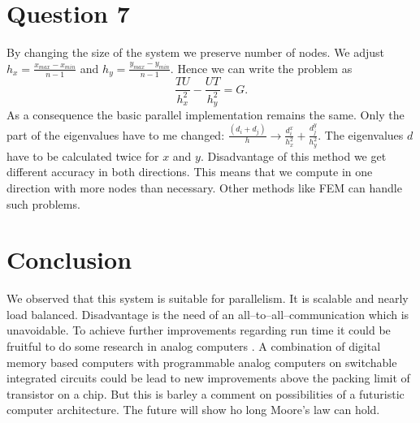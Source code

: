 \section*{Question 7}

By changing the size of the system we preserve number of nodes. We adjust $h_x = \frac{x_{max} - x_{min}}{n-1}$ and $h_y = \frac{y_{max} - y_{min}}{n-1}$. Hence we can write the problem as
\begin{equation}
	\frac{TU}{h_x^2} - \frac{UT}{h_y^2} = G.
\end{equation}
As a consequence the basic parallel implementation remains the same. Only the part of the eigenvalues have to me changed: $\frac{(d_i + d_j)}{h} \to \frac{d_i^x}{h_x^2} + \frac{d_j^y}{h_y^2}$. The eigenvalues $d$ have to be calculated twice for $x$ and $y$. Disadvantage of this method we get different accuracy in both directions. This means that we compute in one direction with more nodes than necessary. Other methods like FEM can handle such problems.


\section*{Conclusion}
We observed that this system is suitable for parallelism. It is scalable and nearly load balanced. Disadvantage is the need of an all--to--all--communication which is unavoidable. To achieve further improvements regarding run time it could be fruitful to do some research in analog computers \cite{ana_comp}. A combination of digital memory based computers with programmable analog computers on switchable integrated circuits could be lead to new improvements above the packing limit of transistor on a chip. But this is barley a comment on possibilities of a futuristic computer architecture. The future will show ho long Moore's law can hold.








